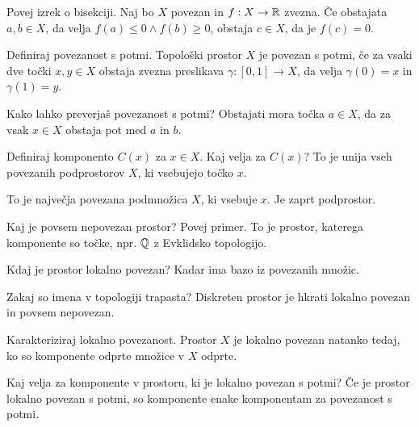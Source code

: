 \begin{vo}{Povej izrek o bisekciji.}
  Naj bo $X$ povezan in $f: X \to \mathbb{R}$ zvezna. Če obstajata $a,b \in X$, da velja
  $f(a) \le 0 \land f(b) \ge 0$, obstaja $c \in X$, da je $f(c) = 0$.
\end{vo}

\begin{vo}{Definiraj povezanost s potmi.}
  Topološki prostor $X$ je povezan s potmi, če za vsaki dve točki $x, y \in X$ obstaja zvezna preslikava
  $\gamma: [0,1] \to X$, da velja $\gamma(0) = x$ in $\gamma(1) = y$.
\end{vo}

\begin{vo}{Kako lahko preverjaš povezanost s potmi?}
  Obstajati mora točka $a \in X$, da za vsak $x \in X$ obstaja pot med $a$ in $b$.
\end{vo}

\begin{vo}{Definiraj komponento $C(x)$ za $x \in X$. Kaj velja za $C(x)$?}
  To je unija vseh povezanih podprostorov $X$, ki vsebujejo točko $x$.

  To je največja povezana podmnožica $X$, ki vsebuje $x$. Je zaprt podprostor.
\end{vo}

\begin{vo}{Kaj je povsem nepovezan prostor? Povej primer.}
  To je prostor, katerega komponente so točke, npr. $\mathbb{Q}$ z Evklidsko topologijo.
\end{vo}

\begin{vo}{Kdaj je prostor lokalno povezan?}
  Kadar ima bazo iz povezanih množic.
\end{vo}

\begin{vo}{Zakaj so imena v topologiji trapasta?}
  Diskreten prostor je hkrati lokalno povezan in povsem nepovezan.
\end{vo}

\begin{vo}{Karakteriziraj lokalno povezanost.}
  Prostor $X$ je lokalno povezan natanko tedaj, ko so komponente
  odprte množice v $X$ odprte.
\end{vo}

\begin{vo}{Kaj velja za komponente v prostoru, ki je lokalno povezan s potmi?}
  Če je prostor lokalno povezan s potmi, so komponente enake komponentam za povezanost s potmi.
\end{vo}

